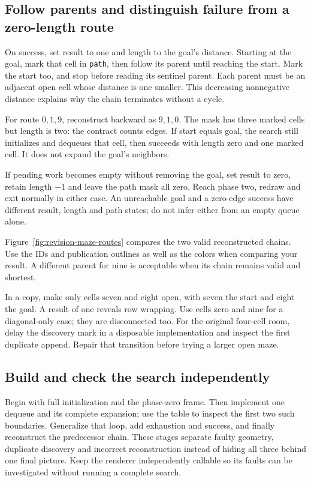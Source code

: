 \subsection*{Follow parents and distinguish failure from a zero-length route}

On success, set result to one and length to the goal's distance. Starting at the
goal, mark that cell in \texttt{path}, then follow its parent until reaching the
start. Mark the start too, and stop before reading its sentinel parent. Each
parent must be an adjacent open cell whose distance is one smaller. This decreasing
nonnegative distance explains why the chain terminates without a cycle.

For route $0,1,9$, reconstruct backward as $9,1,0$. The mask has three marked
cells but length is two: the contract counts edges. If start equals goal, the
search still initializes and dequeues that cell, then succeeds with length zero
and one marked cell. It does not expand the goal's neighbors.

If pending work becomes empty without removing the goal, set result to zero,
retain length $-1$ and leave the path mask all zero. Reach phase two, redraw and
exit normally in either case. An unreachable goal and a zero-edge success have
different result, length and path states; do not infer either from an empty queue
alone.

Figure~\ref{fig:revision-maze-routes} compares the two valid reconstructed chains.
Use the IDs and publication outlines as well as the colors when comparing your
result. A different parent for nine is acceptable when its chain remains valid
and shortest.



In a copy, make only cells seven and eight open, with seven the start and eight
the goal. A result of one reveals row wrapping. Use cells zero and nine for a
diagonal-only case; they are disconnected too. For the original four-cell room,
delay the discovery mark in a disposable implementation and inspect the first
duplicate append. Repair that transition before trying a larger open maze.

\subsection*{Build and check the search independently}

Begin with full initialization and the phase-zero frame. Then implement one
dequeue and its complete expansion; use the table to inspect the first two such
boundaries. Generalize that loop, add exhaustion and success, and finally reconstruct
the predecessor chain. These stages separate faulty geometry, duplicate discovery
and incorrect reconstruction instead of hiding all three behind one final picture.
Keep the renderer independently callable so its faults can be investigated without
running a complete search.

